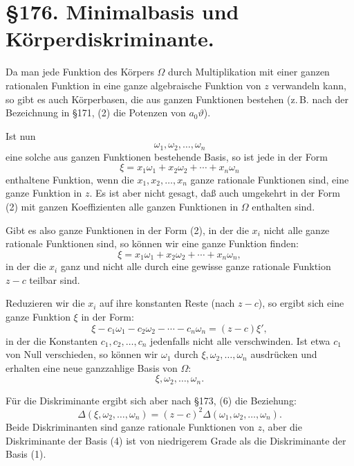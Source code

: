 \documentclass[12pt,a4paper]{article}
\theoremstyle{definition}
\begin{document}
\newpage
\section*{\S 176. Minimalbasis und Körperdiskriminante.}

Da man jede Funktion des Körpers $\Omega$ durch Multiplikation mit einer ganzen rationalen Funktion in eine ganze algebraische Funktion von $z$ verwandeln kann, so gibt es auch Körperbasen, die aus ganzen Funktionen bestehen (z.\,B. nach der Bezeichnung in \S 171, (2) die Potenzen von $a_0\vartheta$).

Ist nun
\begin{equation}
\omega_1, \omega_2, \ldots, \omega_n
\end{equation}
eine solche aus ganzen Funktionen bestehende Basis, so ist jede in der Form
\begin{equation}
\xi = x_1\omega_1 + x_2\omega_2 + \cdots + x_n\omega_n
\end{equation}
enthaltene Funktion, wenn die $x_1, x_2, \ldots, x_n$ ganze rationale Funktionen sind, eine ganze Funktion in $z$. Es ist aber nicht gesagt, daß auch umgekehrt in der Form (2) mit ganzen Koeffizienten alle ganzen Funktionen in $\Omega$ enthalten sind.

Gibt es also ganze Funktionen in der Form (2), in der die $x_i$ nicht alle ganze rationale Funktionen sind, so können wir eine ganze Funktion finden:
\[\xi = x_1\omega_1 + x_2\omega_2 + \cdots + x_n\omega_n,\]
in der die $x_i$ ganz und nicht alle durch eine gewisse ganze rationale Funktion $z - c$ teilbar sind.

Reduzieren wir die $x_i$ auf ihre konstanten Reste (nach $z - c$), so ergibt sich eine ganze Funktion $\xi$ in der Form:
\begin{equation}
\xi - c_1\omega_1 - c_2\omega_2 - \cdots - c_n\omega_n = (z - c)\xi',
\end{equation}
in der die Konstanten $c_1, c_2, \ldots, c_n$ jedenfalls nicht alle verschwinden. Ist etwa $c_1$ von Null verschieden, so können wir $\omega_1$ durch $\xi, \omega_2, \ldots, \omega_n$ ausdrücken und erhalten eine neue ganzzahlige Basis von $\Omega$:
\begin{equation}
\xi, \omega_2, \ldots, \omega_n.
\end{equation}

Für die Diskriminante ergibt sich aber nach \S 173, (6) die Beziehung:
\begin{equation}
\Delta(\xi, \omega_2, \ldots, \omega_n) = (z - c)^2 \Delta(\omega_1, \omega_2, \ldots, \omega_n).
\end{equation}
Beide Diskriminanten sind ganze rationale Funktionen von $z$, aber die Diskriminante der Basis (4) ist von niedrigerem Grade als die Diskriminante der Basis (1).
\end{document}
